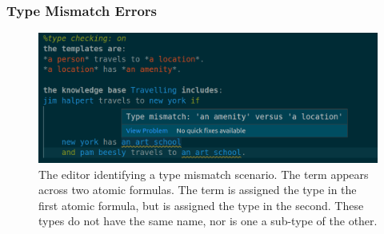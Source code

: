 \documentclass[../main.tex]{subfiles}
\begin{document}
\subsubsection{Type Mismatch Errors}
\begin{figure}[h!]
\centering
\includegraphics[width = \linewidth]{./figures/type-error.png}
\caption{The editor identifying a type mismatch scenario. The term  appears across two atomic formulas. The term is assigned the type  in the first atomic formula, but is assigned the type  in the second. These types do not have the same name, nor is one a sub-type of the other.}
\label{fig:type-mismatch}
\end{figure}
\end{document}
